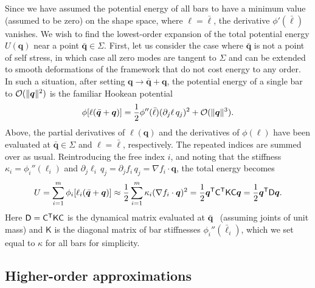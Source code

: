 Since we have assumed the potential energy of all bars to have a minimum value (assumed to be zero) on the shape space, where $\ell = \bar{\ell}$, the derivative $\phi'(\bar{\ell})$ vanishes.
We wish to find the lowest-order expansion of the total potential energy $U(\bm{q})$ near a point $\bar{\bm{q}} \in \Sigma$.
First, let us consider the case where $\bar{\bm{q}}$ is not a point of self stress, in which case all zero modes are tangent to $\Sigma$ and can be extended to smooth deformations of the framework that do not cost energy to any order.
In such a situation, after setting $\bm{q} \to \bar{\bm{q}} + \bm{q}$, the potential energy of a single bar to $\mathcal{O}(\lVert\bm{q}\rVert^2)$ is the familiar Hookean potential
%
\begin{equation}
  \phi[\ell(\bar{\bm{q}} + \bm{q})] =  \frac{1}{2}\phi''(\bar{\ell})(\partial_j \ell\,q_j)^2 + \mathcal{O}(\lVert\bm{q}\rVert^3).
\end{equation}
%
Above, the partial derivatives of $\ell(\bm{q})$ and the derivatives of $\phi(\ell)$ have been evaluated at $\bar{\bm{q}} \in \Sigma$ and $\ell = \bar{\ell}$, respectively.
The repeated indices are summed over as usual.
Reintroducing the free index $i$, and noting that the stiffness $\kappa_{i} = \phi_{i}''(\ell_{i})$ and $\partial_{j}\ell_{i}\,q_{j} = \partial_{j}f_{i}\,q_{j} = \nabla f_{i}\cdot\bm{q}$, the total energy becomes
%
\begin{equation}
  U = \sum_{i=1}^m \phi_i[\ell_i(\bar{\bm{q}} + \bm{q})] \approx \frac{1}{2} \sum_{i=1}^m \kappa_i (\nabla f_i\cdot\bm{q})^2 = \frac{1}{2}\bm{q}^\mathsf{T}\mathsf{C}^\mathsf{T}\mathsf{K}\mathsf{C}\bm{q} = \frac{1}{2}\bm{q}^\mathsf{T}\mathsf{D}\bm{q}.
  \label{eq:regenergy}
\end{equation}
%
Here $\mathsf{D} = \mathsf{C}^\mathsf{T}\mathsf{K}\mathsf{C}$ is the dynamical matrix evaluated at $\bar{\bm{q}}$~\cite{lubensky2015} (assuming joints of unit mass) and $\mathsf{K}$ is the diagonal matrix of bar stiffnesses $\phi_{i}''(\bar{\ell}_{i})$, which we set equal to $\kappa$ for all bars for simplicity.

\subsection{Higher-order approximations}

